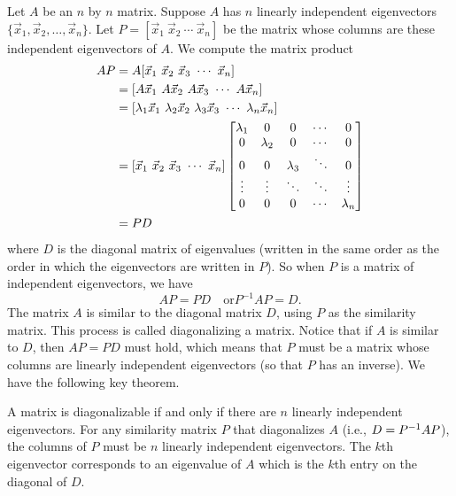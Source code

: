 Let $A$ be an $n$ by $n$ matrix.  Suppose $A$ has $n$ linearly independent eigenvectors $\{\vec x_1,\vec x_2, \ldots, \vec x_n\}$. Let $P = [\vec x_1~\vec x_2~\cdots~\vec x_n]$ be the matrix whose columns are these independent eigenvectors of $A$.  We compute the matrix product
\begin{align*}
AP &= A[\vec x_1~\vec x_2~\vec x_3~\cdots~\vec x_n] \\
&= [A\vec x_1~A\vec x_2~A\vec x_3~\cdots~A\vec x_n] \\
&= [\lambda_1\vec x_1~\lambda_2\vec x_2~\lambda_3\vec x_3~\cdots~\lambda_n\vec x_n] \\
&= [\vec x_1~\vec x_2~\vec x_3~\cdots~\vec x_n]
\begin{bmatrix} 
\lambda_1&0&0&\cdots&0\\
0&\lambda_2&0&\cdots&0\\
0&0&\lambda_3&\ddots&0\\
\vdots&\vdots&\ddots&\ddots&\vdots\\
0&0&0&\cdots&\lambda_n\\ \end{bmatrix}\\
&= PD\end{align*} where $D$ is the diagonal matrix of eigenvalues (written in the same order as the order in which the eigenvectors are written in $P$).  
So when $P$ is a matrix of independent eigenvectors, we have $$AP = PD\quad \text{or}  P^{-1}AP=D.$$ The matrix $A$ is similar to the diagonal matrix $D$, using $P$ as the similarity matrix. 
This process is called diagonalizing a matrix. 
Notice that if $A$ is similar to $D$, then $AP=PD$ must hold, which means that $P$ must be a matrix whose columns are linearly independent eigenvectors (so that $P$ has an inverse). We have the following key theorem.
\begin{theorem}
A matrix is diagonalizable if and only if there are $n$ linearly independent eigenvectors. For any similarity matrix $P$ that diagonalizes $A$ (i.e., $D = P^{-1} A P$), the columns of $P$ must be $n$ linearly independent eigenvectors. The $k$th eigenvector corresponds to an eigenvalue of $A$ which is the $k$th entry on the diagonal of $D$. 
\end{theorem}

